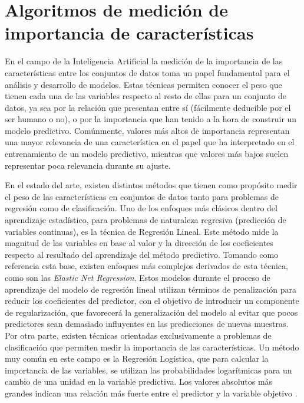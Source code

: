 \section{Algoritmos de medición de importancia de características}
\label{SOAT_FEATURE_IMPORTANCE_METHODS}

En el campo de la Inteligencia Artificial la medición de la importancia de las características entre los conjuntos de datos toma un papel fundamental para el análisis y desarrollo de modelos. Estas técnicas permiten conocer el peso que tienen cada una de las variables respecto al resto de ellas para un conjunto de datos, ya sea por la relación que presentan entre sí (fácilmente deducible por el ser humano o no), o por la importancia que han tenido a la hora de construir un modelo predictivo. Comúnmente, valores más altos de importancia representan una mayor relevancia de una característica  en el papel que ha interpretado en el entrenamiento de un modelo predictivo, mientras que valores más bajos suelen representar poca relevancia durante su ajuste.

En el estado del arte, existen distintos métodos que tienen como propósito medir el peso de las características en conjuntos de datos tanto para problemas de regresión como de clasificación. Uno de los enfoques más clásicos dentro del aprendizaje estadístico, para problemas de naturaleza regresiva (predicción de variables continuas), es la técnica de Regresión Lineal. Este método mide la magnitud de las variables en base al valor y la dirección de los coeficientes respecto al resultado del aprendizaje del método predictivo. Tomando como referencia esta base, existen enfoques más complejos derivados de esta técnica, como son las \textit{Elastic Net Regression}. Estos modelos durante el proceso de aprendizaje del modelo de regresión lineal utilizan términos de penalización para reducir los coeficientes del predictor, con el objetivo de introducir un componente de regularización, que favorecerá la generalización del modelo al evitar que pocos predictores sean demasiado influyentes en las predicciones de nuevas muestras. Por otra parte, existen técnicas orientadas exclusivamente a problemas de clasificación que permiten medir la importancia de las características. Un método muy común en este campo es la Regresión Logística, que para calcular la importancia de las variables, se utilizan las probabilidades logarítmicas para un cambio de una unidad en la variable predictiva. Los valores absolutos más grandes indican una relación más fuerte entre el predictor y la variable objetivo \cite{Saarela2021}.

